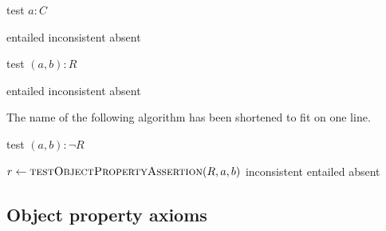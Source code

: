 \documentclass[paper.tex]{subfiles}
\begin{document}
\begin{algorithm}[H]
  \caption{test $a : C$}
  \begin{algorithmic}[1]
    \raggedright
        \State \Return entailed
        \State \Return inconsistent
      \Else
        \State \Return absent
      \EndIf
    \EndFunction
  \end{algorithmic}
\end{algorithm}

\begin{algorithm}[H]
  \caption{test $(a, b) : R$}
  \begin{algorithmic}[1]
    \raggedright
        \State \Return entailed
      \Else
            \State \Return inconsistent
          \EndIf
        \EndFor
        \State \Return absent
      \EndIf
    \EndFunction
  \end{algorithmic}
\end{algorithm}

The name of the following algorithm has been shortened to fit on one line.

\begin{algorithm}[H]
  \caption{test $(a, b) : \neg R$}
  \begin{algorithmic}[1]
    \raggedright
      \State $r \gets \Call{testObjectPropertyAssertion}{R, a, b}$
        \State \Return inconsistent
        \State \Return entailed
      \Else
        \State \Return absent
      \EndIf
    \EndFunction
  \end{algorithmic}
\end{algorithm}

\subsection{Object property axioms}
\label{sec:algorithms:objprop}
\end{document}
